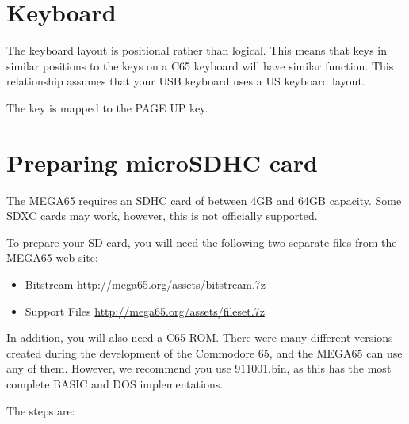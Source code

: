 \section{Keyboard}

The keyboard layout is positional rather than logical.
This means that keys in similar positions to the keys on a C65 keyboard will have similar function.
This relationship assumes that your USB keyboard uses a US keyboard layout.

The  key is mapped to the PAGE UP key.

\newpage

\section{Preparing microSDHC card}

The MEGA65 requires an SDHC card of between 4GB and 64GB capacity.  Some SDXC cards may work, however, this is not officially supported.

To prepare your SD card, you will need the following two separate files from the MEGA65 web site:

\begin{itemize}
\item{Bitstream} \url{http://mega65.org/assets/bitstream.7z}
\item{Support Files} \url{http://mega65.org/assets/fileset.7z}
\end{itemize}

In addition, you will also need a C65 ROM.  There were many different versions created during the development of the Commodore 65,
and the MEGA65 can use any of them.  However, we recommend you use 911001.bin, as this has the most complete BASIC and DOS implementations.

The steps are:


